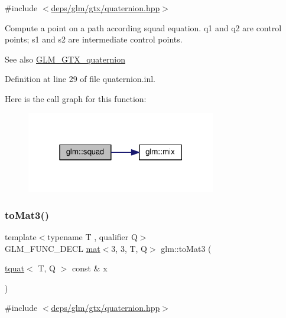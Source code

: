 {\ttfamily \#include $<$\hyperlink{gtx_2quaternion_8hpp}{deps/glm/gtx/quaternion.\+hpp}$>$}

Compute a point on a path according squad equation. q1 and q2 are control points; s1 and s2 are intermediate control points.

\begin{DoxySeeAlso}{See also}
\hyperlink{group__gtx__quaternion}{G\+L\+M\+\_\+\+G\+T\+X\+\_\+quaternion} 
\end{DoxySeeAlso}


Definition at line 29 of file quaternion.\+inl.

Here is the call graph for this function\+:
\nopagebreak
\begin{figure}[H]
\begin{center}
\leavevmode
\includegraphics[width=235pt]{d8/db2/group__gtx__quaternion_gacfcb16619e166e672c4672aff50a565c_cgraph}
\end{center}
\end{figure}
\mbox{\label{group__gtx__quaternion_ga433955cb703d982427fb53b540d02f3d}} 
\subsubsection{\texorpdfstring{to\+Mat3()}{toMat3()}}
{\footnotesize\ttfamily template$<$typename T , qualifier Q$>$ \\
G\+L\+M\+\_\+\+F\+U\+N\+C\+\_\+\+D\+E\+CL \hyperlink{structglm_1_1mat}{mat}$<$3, 3, T, Q$>$ glm\+::to\+Mat3 (\begin{DoxyParamCaption}\item[{\hyperlink{structglm_1_1tquat}{tquat}$<$ T, Q $>$ const \&}]{x }\end{DoxyParamCaption})}



{\ttfamily \#include $<$\hyperlink{gtx_2quaternion_8hpp}{deps/glm/gtx/quaternion.\+hpp}$>$}


